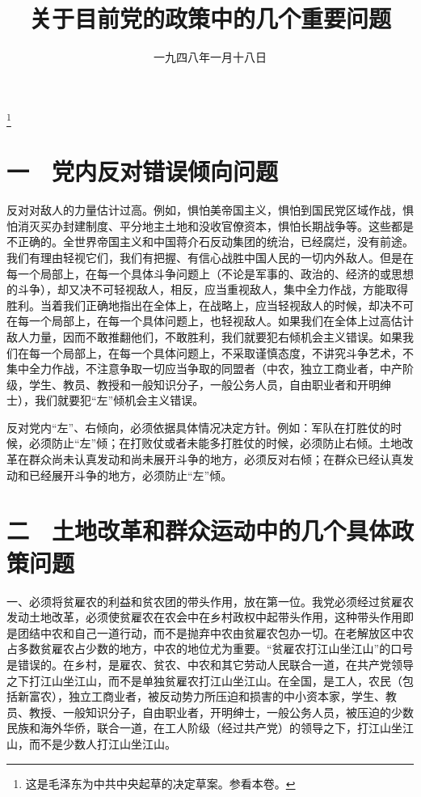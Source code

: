 
\title{关于目前党的政策中的几个重要问题}
\date{一九四八年一月十八日}
\thanks{这是毛泽东为中共中央起草的决定草案。参看本卷。}
\maketitle


\section{一　党内反对错误倾向问题}

反对对敌人的力量估计过高。例如，惧怕美帝国主义，惧怕到国民党区域作战，惧怕消灭买办封建制度、平分地主土地和没收官僚资本，惧怕长期战争等。这些都是不正确的。全世界帝国主义和中国蒋介石反动集团的统治，已经腐烂，没有前途。我们有理由轻视它们，我们有把握、有信心战胜中国人民的一切内外敌人。但是在每一个局部上，在每一个具体斗争问题上（不论是军事的、政治的、经济的或思想的斗争），却又决不可轻视敌人，相反，应当重视敌人，集中全力作战，方能取得胜利。当着我们正确地指出在全体上，在战略上，应当轻视敌人的时候，却决不可在每一个局部上，在每一个具体问题上，也轻视敌人。如果我们在全体上过高估计敌人力量，因而不敢推翻他们，不敢胜利，我们就要犯右倾机会主义错误。如果我们在每一个局部上，在每一个具体问题上，不采取谨慎态度，不讲究斗争艺术，不集中全力作战，不注意争取一切应当争取的同盟者（中农，独立工商业者，中产阶级，学生、教员、教授和一般知识分子，一般公务人员，自由职业者和开明绅士），我们就要犯“左”倾机会主义错误。

反对党内“左”、右倾向，必须依据具体情况决定方针。例如：军队在打胜仗的时候，必须防止“左”倾；在打败仗或者未能多打胜仗的时候，必须防止右倾。土地改革在群众尚未认真发动和尚未展开斗争的地方，必须反对右倾；在群众已经认真发动和已经展开斗争的地方，必须防止“左”倾。

\section{二　土地改革和群众运动中的几个具体政策问题}

一、必须将贫雇农的利益和贫农团的带头作用，放在第一位。我党必须经过贫雇农发动土地改革，必须使贫雇农在农会中在乡村政权中起带头作用，这种带头作用即是团结中农和自己一道行动，而不是抛弃中农由贫雇农包办一切。在老解放区中农占多数贫雇农占少数的地方，中农的地位尤为重要。“贫雇农打江山坐江山”的口号是错误的。在乡村，是雇农、贫农、中农和其它劳动人民联合一道，在共产党领导之下打江山坐江山，而不是单独贫雇农打江山坐江山。在全国，是工人，农民（包括新富农），独立工商业者，被反动势力所压迫和损害的中小资本家，学生、教员、教授、一般知识分子，自由职业者，开明绅士，一般公务人员，被压迫的少数民族和海外华侨，联合一道，在工人阶级（经过共产党）的领导之下，打江山坐江山，而不是少数人打江山坐江山。

